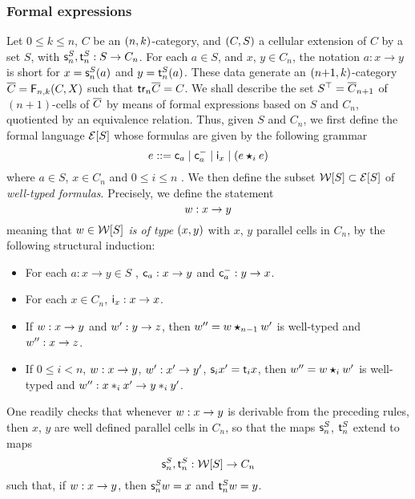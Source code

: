 \subsubsection{Formal expressions}\label{ssubsec:formex}
Let $0\leq k\leq n$, $C$ be an $(n,k)$-category, and  $(C,S)$ a
cellular extension of $C$ by a set $S$, with $\mathsf{s}_{n}^S,\mathsf{t}_{n}^S:S\to C_n$. For each $a\in S$, and $x$,
$y\in C_n$, the notation $a:x\to y$ is short for 
$x=\mathsf{s}_{n}^S(a)$ and $y=\mathsf{t}_{n}^S(a)$. 
These data generate an $(n{+}1,k)$-category $\overline{C}=\mathsf{F}_{n,k}(C,X)$ such that $\mathsf{tr}_{n} \overline{C}=C$. We shall describe the set $S^\top=\overline{C}_{n+1}$ of
$(n{+}1)$-cells of $\overline{C}$ by means of formal expressions
based on $S$ and $C_n$, quotiented by an equivalence relation. Thus,
given $S$ and $C_n$, we first define the formal language $\mathcal{E}[S]$
whose formulas are given by the following grammar
\[
  e ::= \mathsf{c}_{a} \mid \mathsf{c}^{-}_{a} \mid \mathsf{i}_{x} \mid (e\bm{\star}_{i} e)
\]
where $a\in S$, $x\in C_n$ and $0\leq i\leq n$ . We then define the
subset  $\mathcal{W}[S]\subset\mathcal{E}[S]$ of {\em well-typed formulas}.
Precisely, we define the statement
\[w:x\to y\]
meaning that {\em $w\in\mathcal{W}[S]$ is of type $(x,y)$} with $x$, $y$ parallel
cells in $C_n$, by the following structural induction:
\begin{itemize}
\item For each $a:x\to y\in S$ ,
  $\mathsf{c}_{a}:x\to y$
  and $\mathsf{c}^{-}_{a}:y\to x$.
\item For  each $x\in C_n$, $\mathsf{i}_{x}:x\to x$.
 \item If $w:x\to y$ and $w':y\to z$, then $w''=w\bm{\star}_{n-1}w'$ is
   well-typed and $w'':x\to z$.
 \item If $0\leq i<n$, $w:x\to y$, $w':x'\to y'$, $\mathsf{s}_{i}{x'}=\mathsf{t}_{i}{x}$, then $w''=w\bm{\star}_{i} w'$ is well-typed and
   $w'':x\ast_{i} x'\to y\ast_{i} y'$. 
 \end{itemize}
 One readily checks that whenever $w:x\to y$ is derivable from the
 preceding rules, then $x$, $y$ are well defined parallel cells in
 $C_n$, so that the maps $\mathsf{s}_{n}^S$, $\mathsf{t}_{n}^S$ extend to maps
 \[\mathsf{s}_{n}^S, \mathsf{t}_{n}^S :\mathcal{W}[S]\to C_n\]
 such that, if $w:x\to y$,  then $\mathsf{s}_{n}^S w=x$ and $\mathsf{t}_{n}^S w=y$.
